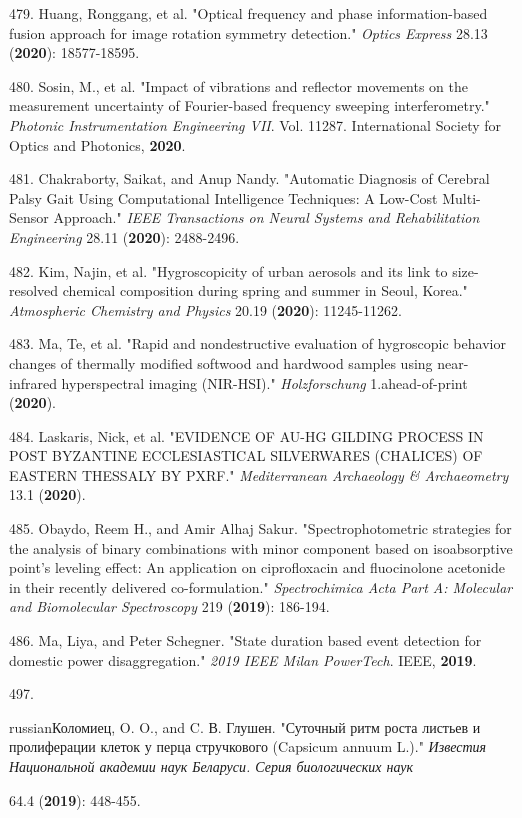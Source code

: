 479. Huang, Ronggang, et al. "Optical frequency and phase information-based fusion approach for image rotation symmetry detection." \textit{Optics Express} 28.13 (\textbf{2020}): 18577-18595.

480. Sosin, M., et al. "Impact of vibrations and reflector movements on the measurement uncertainty of Fourier-based frequency sweeping interferometry." \textit{Photonic Instrumentation Engineering VII}. Vol. 11287. International Society for Optics and Photonics, \textbf{2020}.

481. Chakraborty, Saikat, and Anup Nandy. "Automatic Diagnosis of Cerebral Palsy Gait Using Computational Intelligence Techniques: A Low-Cost Multi-Sensor Approach." \textit{IEEE Transactions on Neural Systems and Rehabilitation Engineering} 28.11 (\textbf{2020}): 2488-2496.

482. Kim, Najin, et al. "Hygroscopicity of urban aerosols and its link to size-resolved chemical composition during spring and summer in Seoul, Korea." \textit{Atmospheric Chemistry and Physics} 20.19 (\textbf{2020}): 11245-11262.

483. Ma, Te, et al. "Rapid and nondestructive evaluation of hygroscopic behavior changes of thermally modified softwood and hardwood samples using near-infrared hyperspectral imaging (NIR-HSI)." \textit{Holzforschung} 1.ahead-of-print (\textbf{2020}).

484. Laskaris, Nick, et al. "EVIDENCE OF AU-HG GILDING PROCESS IN POST BYZANTINE ECCLESIASTICAL SILVERWARES (CHALICES) OF EASTERN THESSALY BY PXRF." \textit{Mediterranean Archaeology \& Archaeometry} 13.1 (\textbf{2020}).

485. Obaydo, Reem H., and Amir Alhaj Sakur. "Spectrophotometric strategies for the analysis of binary combinations with minor component based on isoabsorptive point's leveling effect: An application on ciprofloxacin and fluocinolone acetonide in their recently delivered co-formulation." \textit{Spectrochimica Acta Part A: Molecular and Biomolecular Spectroscopy} 219 (\textbf{2019}): 186-194.

486. Ma, Liya, and Peter Schegner. "State duration based event detection for domestic power disaggregation." \textit{2019 IEEE Milan PowerTech}. IEEE, \textbf{2019}.

497.\begin{otherlanguage*}{russian}Коломиец, O. O., and C. В. Глушен. "Суточный ритм роста листьев и пролиферации клеток у перца стручкового (Capsicum annuum L.)." \textit{Известия Национальной академии наук Беларуси. Серия биологических наук} 
\end{otherlanguage*} 64.4 (\textbf{2019}): 448-455.

